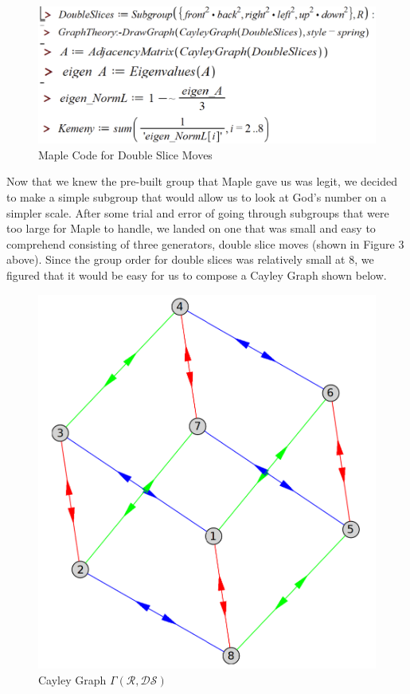 \documentclass{article}
\begin{document}
\begin{figure}[ht]
    \centering
        \includegraphics[scale=0.6]{images/MapleCode.png}
        \caption{Maple Code for Double Slice Moves}
\end{figure}

Now that we knew the pre-built group that Maple gave us was legit, we decided to make a simple subgroup that would allow us to look at God’s number on a simpler scale.  After some trial and error of going through subgroups that were too large for Maple to handle, we landed on one that was small and easy to comprehend consisting of three generators, double slice moves (shown in Figure 3 above).  Since the group order for double slices was relatively small at 8, we figured that it would be easy for us to compose a Cayley Graph shown below.  

\begin{figure}[ht]
    \centering
        \includegraphics[scale=0.6]{images/CayleyGraph.png}
        \caption{Cayley Graph $\Gamma(\mathcal{R},\mathcal{DS})$}
\end{figure}
\end{document}
